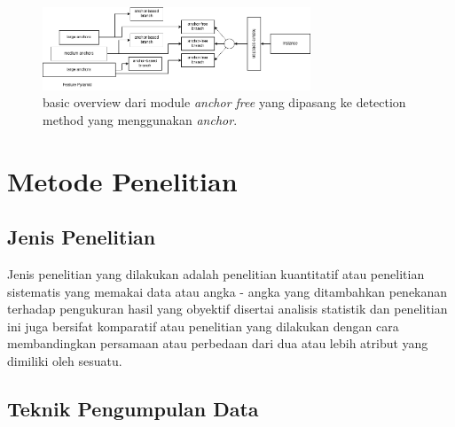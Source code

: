 \documentclass[a4paper]{article}
\begin{document}
\begin{enumerate}
    \begin{figure}[h]
        \includegraphics[width=8cm]{basic_overview_FSAF.png}
        \centering
    
        \caption{basic overview dari module \textit{anchor free} yang dipasang ke detection method yang menggunakan \textit{anchor}\autocite{Zhu_2019_CVPR}.}
    \end{figure}
\end{enumerate}

\newpage
\section*{Metode Penelitian}

\subsection*{Jenis Penelitian}
Jenis penelitian yang dilakukan adalah penelitian kuantitatif atau penelitian sistematis yang memakai data atau angka - angka yang ditambahkan penekanan terhadap pengukuran hasil yang obyektif disertai analisis statistik\autocite{pengajar-1} dan penelitian ini juga bersifat komparatif atau penelitian yang dilakukan dengan cara membandingkan persamaan atau perbedaan dari dua atau lebih atribut yang dimiliki oleh sesuatu\autocite{penerbitdeepublish-1}.

\subsection{Teknik Pengumpulan Data}

\newpage
{}
\printbibliography[title=Referensi]
\end{document}
